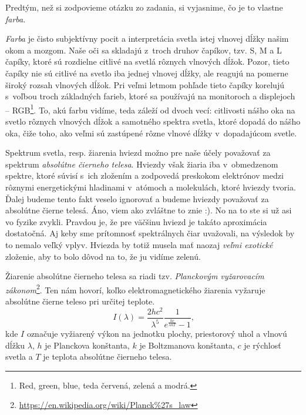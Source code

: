 Predtým, než si zodpovieme otázku zo zadania, si vyjasnime, čo je to vlastne \emph{farba}. 

\emph{Farba} je čisto subjektívny pocit a interpretácia svetla istej vlnovej dĺžky našim okom a mozgom.
Naše oči sa skladajú z~troch druhov čapíkov, tzv. S, M a L čapíky, ktoré sú rozdielne citlivé na svetlá rôznych vlnových dĺžok.
Pozor, tieto čapíky nie sú citlivé na svetlo iba jednej vlnovej dĺžky, ale reagujú na pomerne široký rozsah vlnových dĺžok.
Pri veľmi letmom pohľade tieto čapíky korelujú s~voľbou troch základných farieb, ktoré sa používajú na monitoroch a displejoch -- RGB\footnote{Red, green, blue, teda červená, zelená a modrá.}.
To, akú farbu vidíme, teda záleží od dvoch vecí: citlivosti nášho oka na svetlo rôznych vlnových dĺžok a samotného spektra svetla,
ktoré dopadá do nášho oka, čiže toho, ako veľmi sú zastúpené rôzne vlnové dĺžky v~dopadajúcom svetle.

Spektrum svetla, resp. žiarenia hviezd možno pre naše účely považovať za spektrum \emph{absolútne čierneho telesa}.
Hviezdy však žiaria iba v~obmedzenom spektre, ktoré súvisí s~ich zložením a zodpovedá preskokom 
elektrónov medzi rôznymi energetickými hladinami v~atómoch a molekulách, ktoré hviezdy tvoria.
Ďalej budeme tento fakt veselo ignorovať a budeme hviezdy považovať za absolútne čierne telesá. Áno, viem ako zvláštne to znie :). No na to ste si už asi vo fyzike zvykli. Pravdou je, že pre väčšinu hviezd je takáto aproximácia dostatočná.
Aj keby sme prítomnosť spektrálnych čiar uvažovali, na výsledok by to nemalo veľký vplyv.
Hviezda by totiž musela mať naozaj \emph{veľmi exotické} zloženie, aby to bolo dôvod na to, že ju vidíme zelenú. 




Žiarenie absolútne čierneho telesa sa riadi tzv. \emph{Planckovým vyžarovacím zákonom}\footnote{\url{https://en.wikipedia.org/wiki/Planck\%27s_law}}.
Ten nám hovorí, koľko elektromagnetického žiarenia vyžaruje absolútne čierne teleso pri určitej teplote. 
$$
I(\lambda) = \frac{2hc^2}{\lambda^5}\frac{1}{e^{\frac{hc}{\lambda k T}}-1}\text{,}
$$
kde $I$ označuje vyžiarený výkon na jednotku plochy, priestorový uhol a vlnovú dĺžku $\lambda$, $h$ je Planckova konštanta, $k$ je Boltzmanova konštanta, $c$ je rýchlosť svetla a $T$ je teplota absolútne čierneho telesa.

